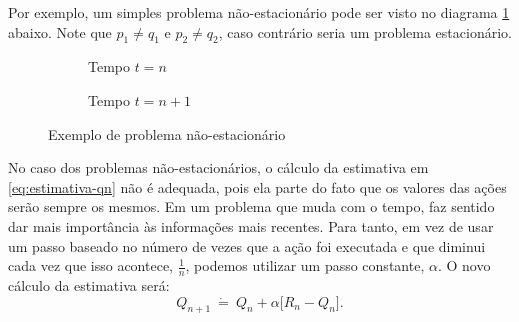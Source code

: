 \documentclass{article}
\begin{document}
        Por exemplo, um simples problema não-estacionário pode ser visto no diagrama \ref{diag:non-stationary} abaixo. Note que $p_1 \neq q_1$ e $p_2 \neq q_2$, caso contrário seria um problema estacionário. 
        \begin{figure}[h]
            \centering
            \begin{subfigure}{.3\linewidth}
                \centering
                \caption{Tempo $t = n$}
            \end{subfigure}
            \begin{subfigure}{.3\linewidth}
                \centering
                \caption{Tempo $t = n+1$}
            \end{subfigure}
            \caption{Exemplo de problema não-estacionário}
            \label{diag:non-stationary}
        \end{figure}

        No caso dos problemas não-estacionários, o cálculo da estimativa em \eqref{eq:estimativa-qn} não é adequada, pois ela parte do fato que os valores das ações serão sempre os mesmos. Em um problema que muda com o tempo, faz sentido dar mais importância às informações mais recentes. Para tanto, em vez de usar um passo baseado no número de vezes que a ação foi executada e que diminui cada vez que isso acontece, $\frac{1}{n}$, podemos utilizar um passo constante, $\alpha$. O novo cálculo da estimativa será:
        \begin{equation}
            Q_{n+1} \ \dot{=} \ Q_n + \alpha \Big[ R_n - Q_n \Big] .
        \end{equation}
\end{document}
